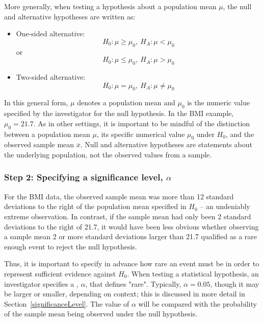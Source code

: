 \begin{spacing}{1.5}
More generally, when testing a hypothesis about a population mean $\mu$, the null and alternative hypotheses are written as:

\begin{itemize}
	\item One-sided alternative: \[H_0: \mu \geq \mu_0, \ H_A: \mu < \mu_0\] or \[H_0: \mu \leq \mu_0, \  H_A: \mu > \mu_0\]
	
	\item Two-sided alternative: \[H_0: \mu = \mu_0, \ H_A: \mu \neq \mu_0\]
\end{itemize}


In this general form, $\mu$ denotes a population mean and $\mu_0$ is the numeric value specified by the investigator for the null hypothesis. In the BMI example, $\mu_0 = 21.7$.  As in other settings, it is important to be mindful of the distinction between a population mean $\mu$, its specific numerical value $\mu_0$ under $H_0$,  and the observed sample mean $\overline{x}$.  Null and alternative hypotheses are statements about the underlying population, not the observed values from a sample.

\subsubsection{Step 2: Specifying a significance level, $\alpha$}

For the  BMI data, the observed sample mean was more than 12 standard deviations to the right of the population mean specified in $H_0$ -- an undeniably extreme observation. In contrast, if the sample mean had only been 2 standard deviations to the right of 21.7, it would have been less obvious whether observing a sample mean 2 or more standard deviations larger than 21.7 qualified as a rare enough event to reject the null hypothesis. 

Thus, it is important to specify in advance how rare an event must be in order to represent sufficient evidence against $H_0$. When testing a statistical hypothesis, an investigator specifies a , $\alpha$, that defines "rare". Typically, $\alpha = 0.05$, though it may be larger or smaller, depending on context; this is discussed in more detail in Section~\ref{significanceLevel}. The value of $\alpha$ will be compared with the probability of the sample mean being observed under the null hypothesis.


\end{spacing}
